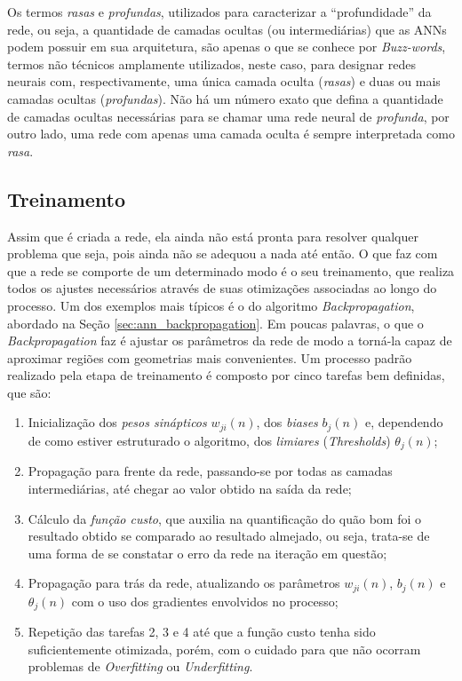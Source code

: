 Os termos \textit{rasas} e \textit{profundas}, utilizados para caracterizar a ``profundidade'' da rede, ou seja, a quantidade de camadas ocultas (ou intermediárias) que as ANNs podem possuir em sua arquitetura, são apenas o que se conhece por \textit{Buzz-words}, termos não técnicos amplamente utilizados, neste caso, para designar redes neurais com, respectivamente, uma única camada oculta (\textit{rasas}) e duas ou mais camadas ocultas (\textit{profundas}). Não há um número exato que defina a quantidade de camadas ocultas necessárias para se chamar uma rede neural de \textit{profunda}, por outro lado, uma rede com apenas uma camada oculta é sempre interpretada como \textit{rasa}.



\subsection{Treinamento}
\label{subsec:ann_training}

Assim que é criada a rede, ela ainda não está pronta para resolver qualquer problema que seja, pois ainda não se adequou a nada até então. O que faz com que a rede se comporte de um determinado modo é o seu treinamento, que realiza todos os ajustes necessários através de suas otimizações associadas ao longo do processo. Um dos exemplos mais típicos é o do algoritmo \textit{Backpropagation}, abordado na Seção \ref{sec:ann_backpropagation}. Em poucas palavras, o que o \textit{Backpropagation} faz é ajustar os parâmetros da rede de modo a torná-la capaz de aproximar regiões com geometrias mais convenientes. Um processo padrão realizado pela etapa de treinamento é composto por cinco tarefas bem definidas, que são:

\begin{enumerate}
    \item Inicialização dos \textit{pesos sinápticos} $w_{ji}(n)$, dos \textit{biases} $b_j(n)$ e, dependendo de como estiver estruturado o algoritmo, dos \textit{limiares} (\textit{Thresholds}) $\theta_{j}(n)$; \\
    \item Propagação para frente da rede, passando-se por todas as camadas intermediárias, até chegar ao valor obtido na saída da rede; \\
    \item Cálculo da \textit{função custo}, que auxilia na quantificação do quão bom foi o resultado obtido se comparado ao resultado almejado, ou seja, trata-se de uma forma de se constatar o erro da rede na iteração em questão; \\
    \item Propagação para trás da rede, atualizando os parâmetros $w_{ji}(n)$, $b_j(n)$ e $\theta_{j}(n)$ com o uso dos gradientes envolvidos no processo; \\
    \item Repetição das tarefas 2, 3 e 4 até que a função custo tenha sido suficientemente otimizada, porém, com o cuidado para que não ocorram problemas de \textit{Overfitting} ou \textit{Underfitting}.
\end{enumerate}

